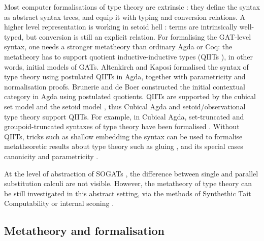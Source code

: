 \documentclass[sigplan,10pt,anonymous,review]{acmart}\settopmatter{printfolios=true,printccs=false,printacmref=false}
\begin{document}
Most computer formalisations of type theory are extrinsic
\cite{DBLP:journals/pacmpl/0001OV18,DBLP:conf/cpp/AdjedjLMPP24,DBLP:journals/jar/SozeauABCFKMTW20}:
they define the syntax as abstract syntax trees, and equip it with
typing and conversion relations. A higher level representation is
working in setoid hell \cite{chapman09eatitself}: terms are
intrinsically well-typed, but conversion is still an explicit
relation. For formalising the GAT-level syntax, one needs a stronger
metatheory than ordinary Agda or Coq: the metatheory has to support
quotient inductive-inductive types (QIITs
\cite{DBLP:journals/pacmpl/KaposiKA19}), in other words, initial
models of GATs. Altenkirch and Kaposi
\cite{DBLP:conf/popl/AltenkirchK16} formalised the syntax of type
theory using postulated QIITs in Agda, together with parametricity and
normalisation \cite{lmcs:4005} proofs. Brunerie and de Boer
\cite{initiality-agda} constructed the initial contextual category in
Agda using postulated quotients. QIITs are supported by the cubical
set model \cite{DBLP:conf/lics/CoquandHM18} and the setoid model
\cite{kaposi-qiit-setoid}, thus Cubical Agda
\cite{DBLP:journals/jfp/VezzosiMA21} and setoid/observational type
theory \cite{setoid,DBLP:phd/hal/Pujet22} support QIITs. For example,
in Cubical Agda, set-truncated and groupoid-truncated syntaxes of type
theory have been formalised \cite{cohtt}. Without QIITs, tricks such
as shallow embedding the syntax can be used to formalise metatheoretic
results about type theory such as gluing
\cite{kaposi_et_al:LIPIcs:2019:10532}, and its special cases
canonicity and parametricity \cite{kaposi-shallow}.

At the level of abstraction of SOGATs
\cite{uemura,DBLP:conf/fscd/KaposiX24}, the difference between single
and parallel substitution calculi are not visible. However, the
metatheory of type theory can be still investigated in this abstract
setting, via the methods of Synthethic Tait Computability
\cite{DBLP:phd/us/Sterling22} or internal sconing
\cite{DBLP:conf/fscd/BocquetKS23}.


\subsection{Metatheory and formalisation}
\end{document}
